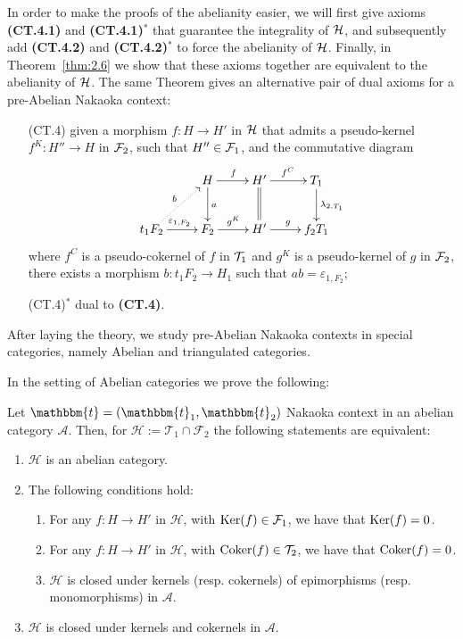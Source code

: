 In order to make the proofs of the abelianity easier, we will first give axioms \textbf{(CT.4.1)} and \textbf{(CT.4.1)$^\ast$} that guarantee the integrality of $\mathcal{H}$, and subsequently add \textbf{(CT.4.2)} and \textbf{(CT.4.2)$^\ast$} to force the abelianity of $\mathcal{H}$. Finally, in Theorem~\ref{thm:2.6} we show that these axioms together are equivalent to the abelianity of $\mathcal{H}$. The same Theorem gives an alternative pair of dual axioms for a pre-Abelian Nakaoka context:
\begin{enumerate}
  \item[(CT.4)] given a morphism $f\colon H\to H'$ in $\mathcal{H}$ that admits a pseudo-kernel $f^K\colon H''\to H$ in $\mathcal{F}_2$, such that $H''\in \mathcal{F}_1$, and the commutative diagram
    \begin{equation*}
      \xymatrix{
        & H\ar[d]^{a}\ar[r]^{f} & H'\ar@{=}[d]\ar[r]^{f^C} & T_1\ar[d]^{\lambda_{2,T_1}}\\
        t_1F_2\ar@{.>}[ur]^{b}\ar[r]^{\varepsilon_{1,F_2}} & F_2\ar[r]^{g^K} & H'\ar[r]^{g} & f_2T_1
      }
    \end{equation*}
    where $f^C$  is a pseudo-cokernel of $f$ in $\mathcal{T}_1$ and $g^K$ is a pseudo-kernel of $g$ in $\mathcal{F}_2$, there exists a morphism $b\colon t_1F_2\to H_1$ such that $ab=\varepsilon_{1,F_2}$;
  \item[(CT.4)$^\ast$] dual to \textbf{(CT.4)}.
\end{enumerate}

After laying the theory, we study pre-Abelian Nakaoka contexts in special categories, namely Abelian and triangulated categories.

In the setting of Abelian categories we prove the following:

\begin{nonlisting_thm}[\ref{thm_2_4}]
  Let $\mathbbm{t}=(\mathbbm{t}_1,\mathbbm{t}_2)$ Nakaoka context in an abelian category
  $\mathscr{A}$. Then, for
  $\mathcal{H}:=\mathcal{T}_1\cap\mathcal{F}_2$ the following statements are equivalent:
  \begin{enumerate}[label=(\alph*)]
    \item $\mathcal{H}$ is an abelian category.
    \item The following conditions hold:
      \begin{enumerate}[label=(\alph{enumi}\arabic*)]
        \item For any $f:H\to H'$ in $\mathcal{H}$, with $\operatorname{Ker}(f)\in\mathcal{F}_1$,
        we have that $\operatorname{Ker}(f)=0$.
        \item For any $f:H\to H'$ in $\mathcal{H}$, with $\operatorname{Coker}(f)\in\mathcal{T}_2$,
        we have that $\operatorname{Coker}(f)=0$.
        \item $\mathcal{H}$ is closed under kernels (resp. cokernels) of epimorphisms
        (resp. monomorphisms) in $\mathscr{A}$.
      \end{enumerate}
    \item $\mathcal{H}$ is closed under kernels and cokernels in $\mathscr{A}$.
  \end{enumerate}
\end{nonlisting_thm}

